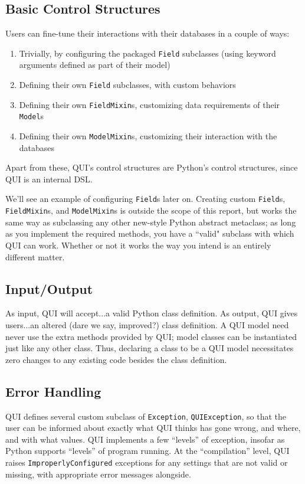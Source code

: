 \documentclass{article} %
\newcommand{\il}[1]{\mbox{\lstinline{#1}}}
\begin{document}
\subsection{Basic Control Structures}
Users can fine-tune their interactions with their databases in a couple of ways:
\begin{enumerate}
\item Trivially, by configuring the packaged \il{Field} subclasses (using keyword arguments defined as part of their model)
\item Defining their own \il{Field} subclasses, with custom behaviors
\item Defining their own \il{FieldMixin}s, customizing data requirements of their \il{Model}s
\item Defining their own \il{ModelMixin}s, customizing their interaction with the databases
\end{enumerate}
Apart from these, QUI's control structures are Python's control structures, since QUI is an internal DSL.

We'll see an example of configuring \il{Field}s later on. Creating custom \il{Field}s, \il{FieldMixin}s, and \il{ModelMixin}s is outside the scope of this report,
but works the same way as subclassing any other new-style Python abstract metaclass; as long as you implement the required methods, you have a ``valid"
subclass with which QUI can work. Whether or not it works the way you intend is an entirely different matter.

\subsection{Input/Output}
As input, QUI will accept...a valid Python class definition. As output, QUI gives users...an altered (dare we say, improved?) class definition.
A QUI model need never use the extra methods provided by QUI; model classes can be instantiated just like any other class. Thus, declaring
a class to be a QUI model necessitates zero changes to any existing code besides the class definition.

\subsection{Error Handling}
QUI defines several custom subclass of \il{Exception}, \il{QUIException}, so that the
user can be informed about exactly what QUI thinks has gone wrong, and where, and with what values.
QUI implements a few ``levels'' of exception, insofar as Python supports ``levels'' of program running. At the ``compilation'' level, QUI
raises \il{ImproperlyConfigured} exceptions for any settings that are not valid or missing, with appropriate error messages alongside.
\end{document}
